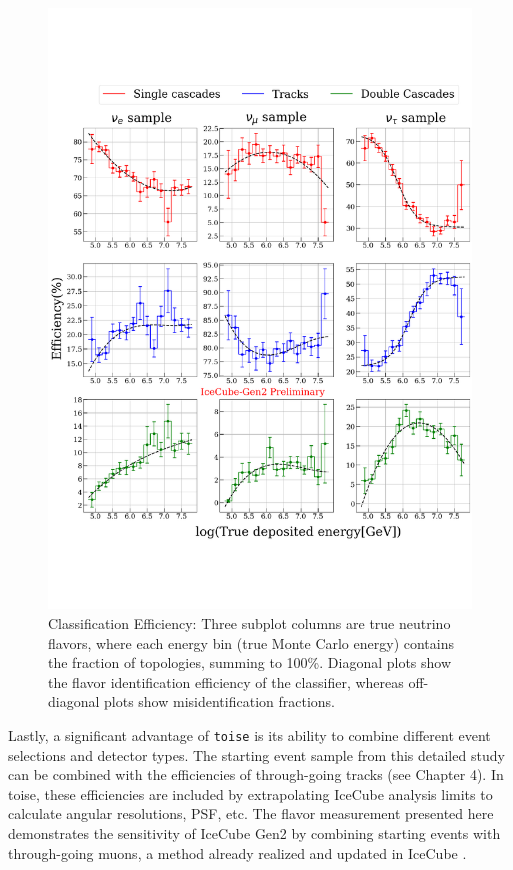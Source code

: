 \begin{figure}[h!]

    \centering
    \includegraphics{./figures/gen2/ClassificationEff_small_watermark.pdf}
    \caption{Classification Efficiency: Three subplot columns are true neutrino flavors, where each energy bin (true Monte Carlo energy) contains the fraction of topologies, summing to 100\%. Diagonal plots show the flavor identification efficiency of the classifier, whereas off-diagonal plots show misidentification fractions.
    }
\end{figure}

Lastly, a significant advantage of \texttt{toise} is its ability to combine different event selections and detector types. The starting event sample from this detailed study can be combined with the efficiencies of through-going tracks (see Chapter 4). In toise, these efficiencies are included by extrapolating IceCube analysis limits  to calculate angular resolutions, PSF, etc. The flavor measurement presented here demonstrates the sensitivity of IceCube Gen2 by combining starting events with through-going muons, a method already realized and updated in IceCube .

